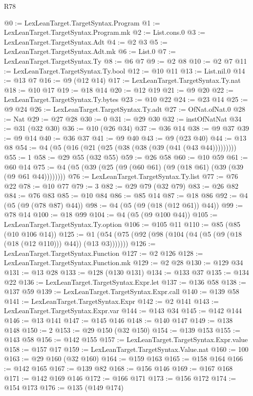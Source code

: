 \begin{lexlean}{R78}
\begin{coremodule}
@0 := LexLeanTarget.TargetSyntax.Program
@1 := LexLeanTarget.TargetSyntax.Program.mk
@2 := List.cons.{0}
@3 := LexLeanTarget.TargetSyntax.Adt
@4 := @2 @3
@5 := LexLeanTarget.TargetSyntax.Adt.mk
@6 := List.{0}
@7 := LexLeanTarget.TargetSyntax.Ty
@8 := @6 @7
@9 := @2 @8
@10 := @2 @7
@11 := LexLeanTarget.TargetSyntax.Ty.bool
@12 := @10 @11
@13 := List.nil.{0}
@14 := @13 @7
@16 := @9 (@12 @14)
@17 := LexLeanTarget.TargetSyntax.Ty.nat
@18 := @10 @17
@19 := @18 @14
@20 := @12 @19
@21 := @9 @20
@22 := LexLeanTarget.TargetSyntax.Ty.bytes
@23 := @10 @22
@24 := @23 @14
@25 := @9 @24
@26 := LexLeanTarget.TargetSyntax.Ty.adt
@27 := OfNat.ofNat.{0}
@28 := Nat
@29 := @27 @28
@30 := 0
@31 := @29 @30
@32 := instOfNatNat
@34 := @31 (@32 @30)
@36 := @10 (@26 @34)
@37 := @36 @14
@38 := @9 @37
@39 := @9 @14
@40 := @36 @37
@41 := @9 @40
@43 := @9 (@23 @40)
@44 := @13 @8
@54 := @4 (@5 (@16 (@21 (@25 (@38 (@38 (@39 (@41 (@43 @44)))))))))
@55 := 1
@58 := @29 @55 (@32 @55)
@59 := @26 @58
@60 := @10 @59
@61 := @60 @14
@75 := @4 (@5 (@39 (@25 (@9 (@60 @61) (@9 (@18 @61) (@39 (@39 (@9 @61 @44))))))))
@76 := LexLeanTarget.TargetSyntax.Ty.list
@77 := @76 @22
@78 := @10 @77
@79 := 3
@82 := @29 @79 (@32 @79)
@83 := @26 @82
@84 := @76 @83
@85 := @10 @84
@86 := @85 @14
@87 := @18 @86
@92 := @4 (@5 (@9 (@78 @87) @44))
@98 := @4 (@5 (@9 (@18 (@12 @61)) @44))
@99 := @78 @14
@100 := @18 @99
@104 := @4 (@5 (@9 @100 @44))
@105 := LexLeanTarget.TargetSyntax.Ty.option
@106 := @105 @11
@110 := @85 (@85 (@10 @106 @14))
@125 := @1 (@54 (@75 (@92 (@98 (@104 (@4 (@5 (@9 (@18 (@18 (@12 @110))) @44)) (@13 @3)))))))
@126 := LexLeanTarget.TargetSyntax.Function
@127 := @2 @126
@128 := LexLeanTarget.TargetSyntax.Function.mk
@129 := @2 @28
@130 := @129 @34
@131 := @13 @28
@133 := @128 (@130 @131)
@134 := @133 @37
@135 := @134 @22
@136 := LexLeanTarget.TargetSyntax.Expr.let
@137 := @136 @58
@138 := @137 @59
@139 := LexLeanTarget.TargetSyntax.Expr.call
@140 := @139 @58
@141 := LexLeanTarget.TargetSyntax.Expr
@142 := @2 @141
@143 := LexLeanTarget.TargetSyntax.Expr.var
@144 := @143 @34
@145 := @142 @144
@146 := @13 @141
@147 := @145 @146
@148 := @140 @147
@149 := @138 @148
@150 := 2
@153 := @29 @150 (@32 @150)
@154 := @139 @153
@155 := @143 @58
@156 := @142 @155
@157 := LexLeanTarget.TargetSyntax.Expr.value
@158 := @157 @17
@159 := LexLeanTarget.TargetSyntax.Value.nat
@160 := 100
@163 := @29 @160 (@32 @160)
@164 := @159 @163
@165 := @158 @164
@166 := @142 @165
@167 := @139 @82
@168 := @156 @146
@169 := @167 @168
@171 := @142 @169 @146
@172 := @166 @171
@173 := @156 @172
@174 := @154 @173
@176 := @135 (@149 @174)

\end{coremodule}
\end{lexlean}
